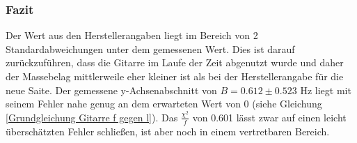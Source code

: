 \documentclass[12pt,a4paper]{article}
\begin{document}
\subsubsection{Fazit}
Der Wert aus den Herstellerangaben liegt im Bereich von 2 Standardabweichungen unter dem gemessenen Wert. Dies ist darauf zurückzuführen, dass die Gitarre im Laufe der Zeit abgenutzt wurde und daher der Massebelag mittlerweile eher kleiner ist als bei der Herstellerangabe für die neue Saite. \newline
Der gemessene y-Achsenabschnitt von $B = 0.612 \pm 0.523$ Hz liegt mit seinem Fehler nahe genug an dem erwarteten Wert von 0 (siehe Gleichung \ref{Grundgleichung Gitarre f gegen l}).
\newline
Das $\frac{\chi^2}{f}$ von 0.601 lässt zwar auf einen leicht überschätzten Fehler schließen, ist aber noch in einem vertretbaren Bereich.
\end{document}
